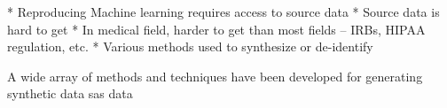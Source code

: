 
* Reproducing Machine learning requires access to source data
* Source data is hard to get
* In medical field, harder to get than most fields – IRBs, HIPAA regulation, etc.
* Various methods used to synthesize or de-identify

A wide array of methods and techniques have been developed for generating synthetic data sas  data \cite{walonoski_synthea:_2018}


